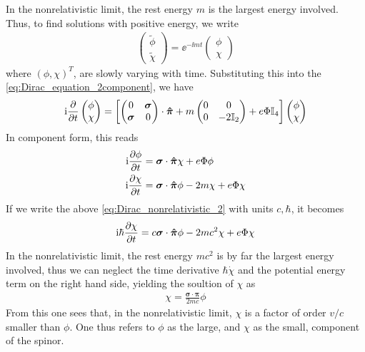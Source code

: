 In the nonrelativistic limit, the rest energy $m$ is the largest energy involved. Thus, to find solutions with positive energy, we write 
\begin{align}
    \begin{pmatrix}
        \tilde{\phi} \\
        \tilde{\chi}
    \end{pmatrix} = \ee^{-\ii m t} \begin{pmatrix}
        \phi \\
        \chi
    \end{pmatrix}
\end{align}
where $(\phi,\chi)^T$, are slowly varying with time. Substituting this into the \cref{eq:Dirac_equation_2component}, we have 
\begin{align}
    \mathrm{i} \frac{\partial }{\partial t} \begin{pmatrix}
        \phi \\
        \chi
    \end{pmatrix} = \left[ \begin{pmatrix}
        0 & \boldsymbol{\sigma} \\
        \boldsymbol{\sigma} & 0
    \end{pmatrix} \cdot \boldsymbol{\hat{\pi}} + m \begin{pmatrix}
        0 & 0 \\
        0 & -2 \mathbb{I}_2
    \end{pmatrix} + e \Phi \mathbb{I}_4 \right] \begin{pmatrix}
        \phi \\
        \chi
    \end{pmatrix}
\end{align}
In component form, this reads
\begin{align}
    \mathrm{i} \frac{\partial \phi}{\partial t} &= \boldsymbol{\sigma} \cdot \boldsymbol{\hat{\pi}} \chi + e \Phi \phi \label{eq:Dirac_nonrelativistic_1} \\
    \mathrm{i} \frac{\partial \chi}{\partial t} &= \boldsymbol{\sigma} \cdot \boldsymbol{\hat{\pi}} \phi - 2 m \chi + e \Phi \chi \label{eq:Dirac_nonrelativistic_2}
\end{align}
If we write the above \cref{eq:Dirac_nonrelativistic_2} with units $c, \hbar$, it becomes
\begin{align}
    \mathrm{i} \hbar \frac{\partial \chi}{\partial t} = c \boldsymbol{\sigma} \cdot \boldsymbol{\hat{\pi}} \phi - 2 m c^2 \chi + e \Phi \chi
\end{align}
In the nonrelativistic limit, the rest energy $m c^2$ is by far the largest energy involved, thus we can neglect the time derivative $\hbar \dot{\chi}$ and the potential energy term on the right hand side, yielding the soultion of $\chi$ as 
\begin{align*}
    \chi = \frac{\boldsymbol{\sigma} \cdot \boldsymbol{\pi}}{2mc} \phi 
\end{align*}
From this one sees that, in the nonrelativistic limit, $\chi$ is a factor of order $v/c$ smaller than $\phi$. One thus refers to $\phi$ as the large, and $\chi$ as the small, component of the spinor.

